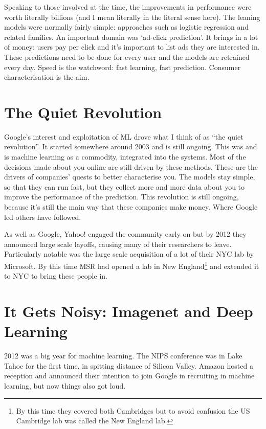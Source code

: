 \documentclass[a4paper]{caesar_book}
\begin{document}
Speaking to those involved at the time, the improvements in performance were worth literally billions (and I mean literally in the literal sense here). The leaning models were normally fairly simple: approaches such as logistic regression and related families. An important domain was ‘ad-click prediction’. It brings in a lot of money: users pay per click and it’s important to list ads they are interested in. These predictions need to be done for every user and the models are retrained every day. Speed is the watchword: fast learning, fast prediction. Consumer characterisation is the aim.

\section{The Quiet Revolution}

Google's interest and exploitation of ML drove what I think of as “the quiet revolution”. It started somewhere around 2003 and is still ongoing. This was and is machine learning as a commodity, integrated into the systems. Most of the decisions made about you online are still driven by these methods. These are the drivers of companies’ quests to better characterise you. The models stay simple, so that they can run fast, but they collect more and more data about you to improve the performance of the prediction. This revolution is still ongoing, because it’s still the main way that these companies make money. Where Google led others have followed.

As well as Google, Yahoo! engaged the community early on but by 2012 they announced large scale layoffs, causing many of their researchers to leave. Particularly notable was the large scale acquisition of a lot of their NYC lab by Microsoft. By this time MSR had opened a lab in New England\footnote{By this time they covered both Cambridges but to avoid confusion the US Cambridge lab was called the New England lab.} and extended it to NYC to bring these people in.

\section{It Gets Noisy: Imagenet and Deep Learning}

2012 was a big year for machine learning. The NIPS conference was in Lake Tahoe for the first time, in spitting distance of Silicon Valley. Amazon hosted a reception and announced their intention to join Google in recruiting in machine learning, but now things also got loud.
\end{document}
